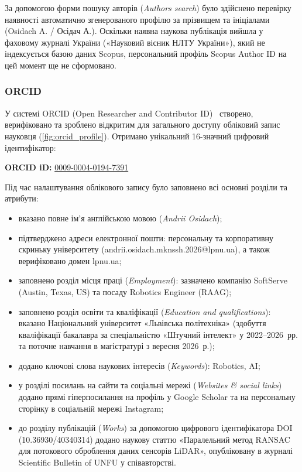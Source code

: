\documentclass{article}
\begin{document}
За допомогою форми пошуку авторів (\textit{Authors search}) було здійснено перевірку наявності автоматично згенерованого профілю за прізвищем та ініціалами (Osidach A. / Осідач А.). Оскільки наявна наукова публікація вийшла у фаховому журналі України («Науковий вісник НЛТУ України»), який не індексується базою даних Scopus, персональний профіль Scopus Author ID на цей момент ще не сформовано.

\subsubsection{ORCID}
У системі ORCID (Open Researcher and Contributor ID)~\cite{orcid} створено, верифіковано та
зроблено відкритим для загального доступу обліковий запис науковця (\cref{fig:orcid_profile}).
Отримано унікальний 16-значний цифровий ідентифікатор:
\begin{center}
  \textbf{ORCID iD:} \href{https://orcid.org/0009-0004-0194-7391}{0009-0004-0194-7391}
\end{center}

Під час налаштування облікового запису було заповнено всі основні розділи та атрибути:
\begin{itemize}
  \item вказано повне ім'я англійською мовою (\textit{Andrii Osidach});
  \item підтверджено адреси електронної пошти: персональну та корпоративну скриньку університету (\mbox{andrii.osidach.mknssh.2026@lpnu.ua}), а також верифіковано домен \mbox{lpnu.ua};
  \item заповнено розділ місця праці (\textit{Employment}): зазначено компанію SoftServe (Austin, Texas, US) та посаду Robotics Engineer (RAAG);
  \item заповнено розділ освіти та кваліфікації (\textit{Education and qualifications}): вказано Національний університет «Львівська політехніка» (здобуття кваліфікації бакалавра за спеціальністю «Штучний інтелект» у 2022--2026~рр. та поточне навчання в магістратурі з вересня 2026~р.);
  \item додано ключові слова наукових інтересів (\textit{Keywords}): Robotics, AI;
  \item у розділі посилань на сайти та соціальні мережі (\textit{Websites \& social links}) додано прямі гіперпосилання на профіль у Google Scholar та на персональну сторінку в соціальній мережі Instagram;
  \item до розділу публікацій (\textit{Works}) за допомогою цифрового ідентифікатора DOI (\mbox{10.36930/40340314}) додано наукову статтю «Паралельний метод RANSAC для потокового оброблення даних сенсорів LiDAR», опубліковану в журналі Scientific Bulletin of UNFU у співавторстві.
\end{itemize}
\end{document}
